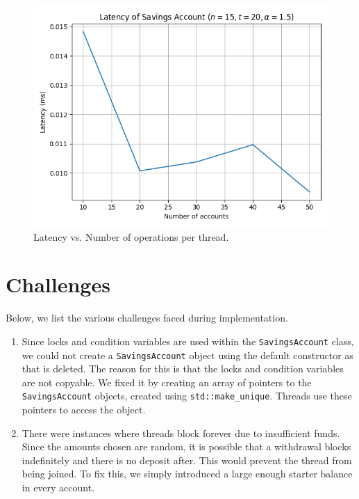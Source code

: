 \documentclass[conference,compsoc]{IEEEtran}
\begin{document}
\begin{figure}[!ht]
    \centering
    \includegraphics[width=\columnwidth]{images/exp3.png}
    \caption{Latency vs. Number of operations per thread.}
    \label{fig:exp3}
\end{figure}

\section{Challenges}

Below, we list the various challenges faced during implementation.
\begin{enumerate}
    \item Since locks and condition variables are used within the
    \texttt{SavingsAccount} class, we could not create a \texttt{SavingsAccount}
    object using the default constructor as that is deleted. The reason for this
    is that the locks and condition variables are not copyable. We fixed it by
    creating an array of pointers to the \texttt{SavingsAccount} objects,
    created using \texttt{std::make\_unique}. Threads use these pointers to
    access the object.
    \item There were instances where threads block forever due to insufficient
    funds. Since the amounts chosen are random, it is possible that a withdrawal
    blocks indefinitely and there is no deposit after. This would prevent the
    thread from being joined. To fix this, we simply introduced a large enough
    starter balance in every account.
\end{enumerate}
\end{document}

